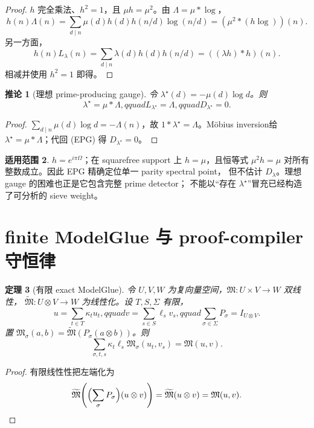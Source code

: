 \documentclass[11pt,a4paper]{ctexart}
\newtheorem{theorem}{定理}[section]
\newtheorem{corollary}[theorem]{推论}
\theoremstyle{definition}
\newtheorem{remark}[theorem]{适用范围}
\newcommand{\1}{\mathbf 1}
\begin{document}
\begin{proof}
$h$ 完全乘法、$h^2=1$，且 $\mu h=\mu^2$。由 $\Lambda=\mu*\log$，
\[
h(n)\Lambda(n)
=\sum_{d\mid n}\mu(d)h(d)h(n/d)\log(n/d)
=(\mu^2*(h\log))(n).
\]
另一方面，
\[
h(n)L_\lambda(n)
=\sum_{d\mid n}\lambda(d)h(d)h(n/d)
=((\lambda h)*h)(n).
\]
相减并使用 $h^2=1$ 即得。
\end{proof}

\begin{corollary}[理想 prime-producing gauge]
令 $\lambda^\star(d)=-\mu(d)\log d$。则
\[
\lambda^\star=\mu*\Lambda,qquad
L_{\lambda^\star}=\Lambda,qquad D_{\lambda^\star}=0. \tag{17.2}
\]
\end{corollary}

\begin{proof}
$\sum_{d\mid n}\mu(d)\log d=-\Lambda(n)$，故
$1*\lambda^\star=\Lambda$。Möbius inversion给
$\lambda^\star=\mu*\Lambda$；代回 (EPG) 得 $D_{\lambda^\star}=0$。
\end{proof}

\begin{remark}
$h=e^{i\pi\Omega}$；在 squarefree support 上 $h=\mu$，且恒等式
$\mu^2h=\mu$ 对所有整数成立。因此 EPG 精确定位单一 parity spectral point，
但不估计 $D_\lambda$。理想 gauge 的困难也正是它包含完整 prime detector；
不能以“存在 $\lambda^\star$”冒充已经构造了可分析的 sieve weight。
\end{remark}

\section{finite ModelGlue 与 proof-compiler 守恒律}

\begin{theorem}[有限 exact ModelGlue]\label{thm:tool-modelglue}
令 $U,V,W$ 为复向量空间，$\mathfrak M:U\times V\to W$ 双线性，
$\widetilde{\mathfrak M}:U\otimes V\to W$ 为线性化。设 $T,S,\Sigma$ 有限，
\[
u=\sum_{t\in T}\kappa_tu_t,qquad
v=\sum_{s\in S}\ell_sv_s,qquad
\sum_{\sigma\in\Sigma}P_\sigma=I_{U\otimes V}.       \tag{18.1}
\]
置 $\mathfrak M_\sigma(a,b)=
\widetilde{\mathfrak M}(P_\sigma(a\otimes b))$。则
\[
\boxed{
\sum_{\sigma,t,s}\kappa_t\ell_s
\mathfrak M_\sigma(u_t,v_s)=\mathfrak M(u,v).}        \tag{MG}
\]
\end{theorem}

\begin{proof}
有限线性性把左端化为
\[
\widetilde{\mathfrak M}\!\left(
\Bigl(\sum_\sigma P_\sigma\Bigr)(u\otimes v)\right)
=\widetilde{\mathfrak M}(u\otimes v)=\mathfrak M(u,v).
\]
\end{proof}
\end{document}
